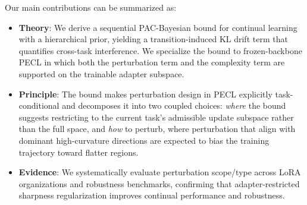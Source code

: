 \documentclass{article}
\theoremstyle{plain}
\theoremstyle{definition}
\theoremstyle{remark}
\begin{document}
Our main contributions can be summarized as:
\begin{itemize}
\vspace{-8pt}
\item  \textbf{Theory}: We derive a sequential PAC-Bayesian bound for continual learning with a hierarchical prior, yielding a transition-induced KL drift term that quantifies cross-task interference.
We specialize the bound to frozen-backbone PECL in which both the perturbation term and the complexity term are supported on the trainable adapter subspace.
\vspace{-2pt}
\item \textbf{Principle}: The bound makes perturbation design in PECL explicitly {task-conditional} and decomposes it into two coupled choices: \emph{where} the bound suggests restricting to the current task's admissible update subspace rather than the full space, and \emph{how} to perturb, where perturbation that align with dominant high-curvature directions are expected to bias the training trajectory toward flatter regions.
\vspace{-2pt}
\item \textbf{Evidence}: We systematically evaluate perturbation scope/type across LoRA organizations and robustness benchmarks, confirming that adapter-restricted sharpness regularization improves continual performance and robustness.
\end{itemize}
\end{document}
